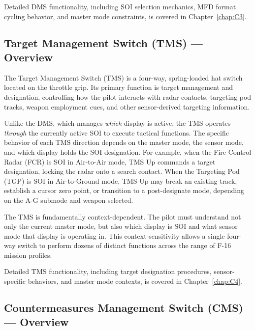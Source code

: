 \documentclass[11pt, a4paper, twoside]{report}
\begin{document}
Detailed DMS functionality, including SOI selection mechanics, MFD format cycling behavior, and master mode constraints, is covered in Chapter~\ref{chap:C3}.


\subsection{Target Management Switch (TMS) — Overview}
\label{sec:C2-S3-S2}

The Target Management Switch (TMS) is a four-way, spring-loaded hat switch located on the throttle grip. Its primary function is target management and designation, controlling how the pilot interacts with radar contacts, targeting pod tracks, weapon employment cues, and other sensor-derived targeting information.

Unlike the DMS, which manages \textit{which} display is active, the TMS operates \textit{through} the currently active SOI to execute tactical functions. The specific behavior of each TMS direction depends on the master mode, the sensor mode, and which display holds the SOI designation. For example, when the Fire Control Radar (FCR) is SOI in Air-to-Air mode, TMS Up commands a target designation, locking the radar onto a search contact. When the Targeting Pod (TGP) is SOI in Air-to-Ground mode, TMS Up may break an existing track, establish a cursor zero point, or transition to a post-designate mode, depending on the A-G submode and weapon selected.

The TMS is fundamentally context-dependent. The pilot must understand not only the current master mode, but also which display is SOI and what sensor mode that display is operating in. This context-sensitivity allows a single four-way switch to perform dozens of distinct functions across the range of F-16 mission profiles.

Detailed TMS functionality, including target designation procedures, sensor-specific behaviors, and master mode contexts, is covered in Chapter~\ref{chap:C4}.


\subsection{Countermeasures Management Switch (CMS) — Overview}
\label{sec:C2-S3-S3}
\end{document}
